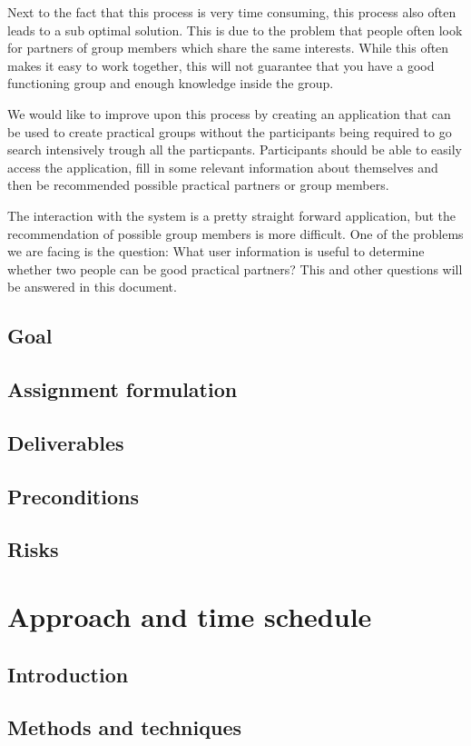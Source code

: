 \documentclass[]{article}
\begin{document}
Next to the fact that this process is very time consuming, this process also often leads to a sub optimal solution.
This is due to the problem that people often look for partners of group members which share the same interests.
While this often makes it easy to work together, this will not guarantee that you have a good functioning group and enough knowledge inside the group.

We would like to improve upon this process by creating an application that can be used to create practical groups without the participants being required to go search intensively trough all the particpants.
Participants should be able to easily access the application, fill in some relevant information about themselves and then be recommended possible practical partners or group members.

The interaction with the system is a pretty straight forward application, but the recommendation of possible group members is more difficult.
One of the problems we are facing is the question: What user information is useful to determine whether two people can be good practical partners?
This and other questions will be answered in this document.

\subsection{Goal}
\subsection{Assignment formulation}
\subsection{Deliverables}
\subsection{Preconditions}
\subsection{Risks}
\section{Approach and time schedule}
\subsection{Introduction}
\subsection{Methods and techniques}
\end{document}
